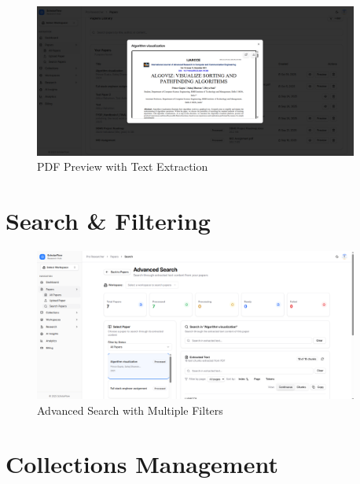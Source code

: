 \begin{figure}[H]
\centering
\includegraphics[width=0.95\textwidth]{images/screenshots/pdf_preview.png}
\caption{PDF Preview with Text Extraction}
\label{fig:screenshot-pdf-preview}
\end{figure}

\section{Search \& Filtering}
\label{sec:screenshots-search}

\begin{figure}[H]
\centering
\includegraphics[width=0.95\textwidth]{images/screenshots/advanced_search.png}
\caption{Advanced Search with Multiple Filters}
\label{fig:screenshot-search}
\end{figure}

\section{Collections Management}
\label{sec:screenshots-collections}

